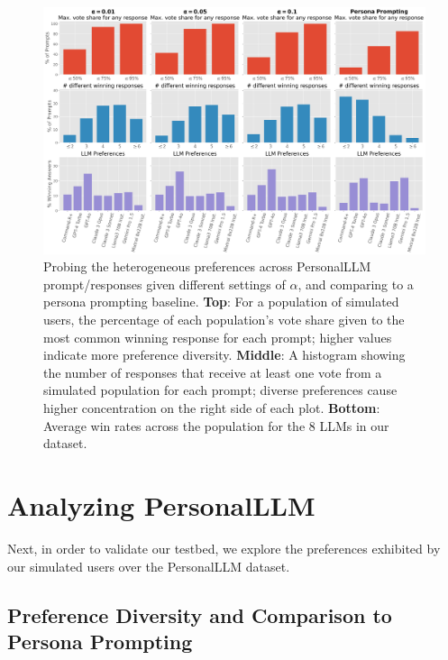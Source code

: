 \begin{figure}[!ht]
    \centering 
    \includegraphics[width=\linewidth]{figures/persona_prompting_comparison.png}
    \caption{Probing the heterogeneous preferences across \textsf{PersonalLLM} prompt/responses given different settings of $\alpha$, and comparing to a persona prompting baseline.  \textbf{Top}: For a population of simulated users, the percentage of each population's vote share given to the most common winning response for each prompt; higher values indicate more preference diversity. \textbf{Middle}: A histogram showing the number of responses that receive at least one vote from a simulated population for each prompt; diverse preferences cause higher concentration on the right side of each plot. \textbf{Bottom}: Average win rates across the population for the 8 LLMs in our dataset.}
    \label{fig:persona_diversity}
\end{figure}

\section{Analyzing PersonalLLM}\label{sec:persona_analysis}

Next, in order to validate our testbed, we explore the preferences exhibited by our simulated users over the \textsf{PersonalLLM} dataset.  

\subsection{Preference Diversity and Comparison to Persona Prompting}

